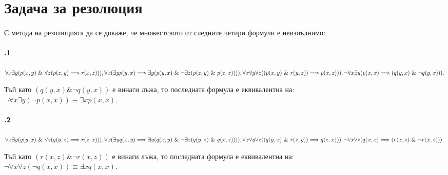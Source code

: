 \documentclass[12pt]{article}
\begin{document}
\vskip 0.2in

\newpage
\section{Задача за резолюция}
\paragraph{}
С метода на резолюцията да се докаже, че множестсвото от следните четири формули е неизпълнимо:\\
\paragraph{\hspace{0.5em} .1} 
\begin{addmargin}[1em]{2em}
$\forall x \exists y (p(x,y)\ \& \ \forall z (p(z,y) \Longrightarrow r(x,z))),\\
\forall x( \exists y p(y,x) \Longrightarrow \exists y(p(y,x)\ \& \ \neg\exists z(p(z,y)\ \& \ p(z,x)))), \\
\forall x \forall y \forall z ((p(x,y)\ \& \ r(y,z)) \Longrightarrow p(x, z))),\\
\neg \forall x \exists y (p(x,x) \Longrightarrow (q(y, x) \ \& \ \neg q(y,x))).$
\end{addmargin}

\indent * Тъй като $(q(y, x)\&\neg q(y, x))$ е винаги лъжа, то последната формула е еквивалентна на: \\ \indent $ \neg \forall x \exists y (\neg p(x,x))  \equiv \exists x p(x,x).$ \\
\paragraph{\hspace{0.5em} .2} 
\begin{addmargin}[1em]{2em}
$\forall x \exists y (q(y,x)\ \& \ \forall z (q(y,z) \Longrightarrow r(z,x))),\\
\forall x( \exists y q(x,y) \Longrightarrow \exists y(q(x,y)\ \& \ \neg\exists z(q(y,z)\ \& \ q(x,z)))), \\
\forall x \forall y \forall z ((q(y,x)\ \& \ r(z,y)) \Longrightarrow q(z, x))),\\
\neg \forall x \forall z (q(x,x) \Longrightarrow (r(x,z) \ \& \ \neg r(x,z))).$
\end{addmargin}

\indent * Тъй като $(r(x, z)\&\neg r(x, z))$ е винаги лъжа, то последната формула е еквивалентна на: \\ \indent $ \neg \forall x \forall z (\neg q(x,x))  \equiv \exists x q(x,x).$ \\
\vskip 0.2in
\end{document}
